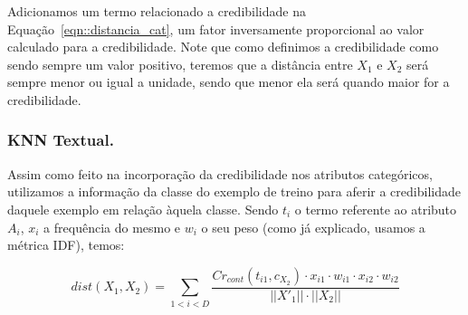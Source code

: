 Adicionamos um termo relacionado a credibilidade na Equação~\ref{eqn::distancia_cat}, um fator inversamente proporcional ao valor calculado para a credibilidade. Note que como definimos a credibilidade como sendo sempre um valor positivo, teremos que a distância entre $X_1$ e $X_2$ será sempre menor ou igual a unidade, sendo que menor ela será quando maior for a credibilidade. 


\subsubsection{\textsc{KNN} Textual.}
\label{subsubsec::knntexto}

Assim como feito na incorporação da credibilidade nos atributos categóricos, utilizamos a informação da classe do exemplo de treino para aferir a credibilidade daquele exemplo em relação àquela classe. Sendo $t_i$ o termo referente ao atributo $A_i$, $x_i$ a frequência do mesmo e $w_i$ o seu peso (como já explicado, usamos a métrica \textsc{IDF}), temos:

\begin{equation}\label{eqn::distancia_texto_cat}
    dist(X_1, X_2) = \sum\limits_{1 < i < D}\frac{  Cr_{cont}(t_{i1}, c_{X_2}) \cdot x_{i1} \cdot w_{i1} \cdot x_{i2} \cdot w_{i2} }{ ||X'_1|| \cdot ||X_2|| }
\end{equation}

